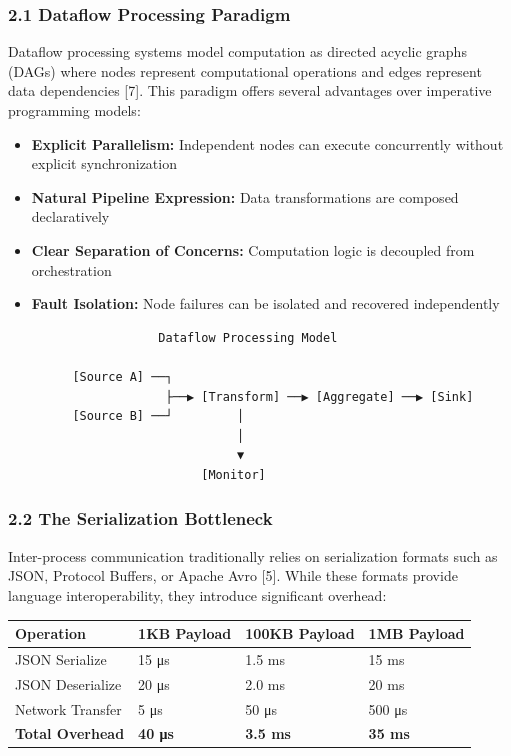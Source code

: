 \documentclass[
]{article}
\providecommand{\tightlist}{%
  \setlength{\itemsep}{0pt}\setlength{\parskip}{0pt}}
\begin{document}
\hypertarget{dataflow-processing-paradigm}{%
\subsubsection{2.1 Dataflow Processing
Paradigm}\label{dataflow-processing-paradigm}}

Dataflow processing systems model computation as directed acyclic graphs
(DAGs) where nodes represent computational operations and edges
represent data dependencies {[}7{]}. This paradigm offers several
advantages over imperative programming models:

\begin{itemize}
\tightlist
\item
  \textbf{Explicit Parallelism:} Independent nodes can execute
  concurrently without explicit synchronization
\item
  \textbf{Natural Pipeline Expression:} Data transformations are
  composed declaratively
\item
  \textbf{Clear Separation of Concerns:} Computation logic is decoupled
  from orchestration
\item
  \textbf{Fault Isolation:} Node failures can be isolated and recovered
  independently
\end{itemize}

\begin{verbatim}
                     Dataflow Processing Model
    
         [Source A] ──┐
                      ├──▶ [Transform] ──▶ [Aggregate] ──▶ [Sink]
         [Source B] ──┘         │
                                │
                                ▼
                           [Monitor]
\end{verbatim}

\hypertarget{the-serialization-bottleneck}{%
\subsubsection{2.2 The Serialization
Bottleneck}\label{the-serialization-bottleneck}}

Inter-process communication traditionally relies on serialization
formats such as JSON, Protocol Buffers, or Apache Avro {[}5{]}. While
these formats provide language interoperability, they introduce
significant overhead:

\begin{longtable}[]{@{}llll@{}}
\toprule\noalign{}
Operation & 1KB Payload & 100KB Payload & 1MB Payload \\
\midrule\noalign{}
\endhead
\bottomrule\noalign{}
\endlastfoot
JSON Serialize & 15 μs & 1.5 ms & 15 ms \\
JSON Deserialize & 20 μs & 2.0 ms & 20 ms \\
Network Transfer & 5 μs & 50 μs & 500 μs \\
\textbf{Total Overhead} & \textbf{40 μs} & \textbf{3.5 ms} & \textbf{35
ms} \\
\end{longtable}
\end{document}
